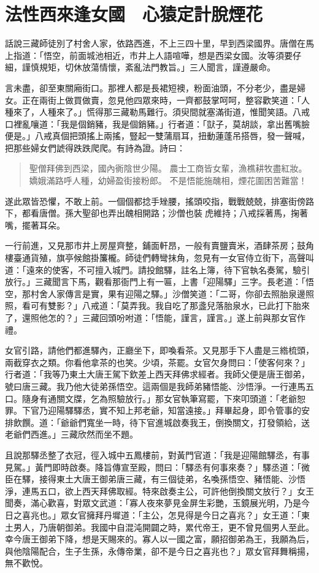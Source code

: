 
\chapter{法性西來逢女國　心猿定計脫煙花}

話說三藏師徒別了村舍人家，依路西進，不上三四十里，早到西梁國界。唐僧在馬上指道：「悟空，前面城池相近，市井上人語喧嘩，想是西梁女國。汝等須要仔細，謹慎規矩，切休放蕩情懷，紊亂法門教旨。」三人聞言，謹遵嚴命。

言未盡，卻至東關廂街口。那裡人都是長裙短襖，粉面油頭，不分老少，盡是婦女。正在兩街上做買做賣，忽見他四眾來時，一齊都鼓掌呵呵，整容歡笑道：「人種來了，人種來了。」慌得那三藏勒馬難行。須臾間就塞滿街道，惟聞笑語。八戒口裡亂嚷道：「我是個銷豬，我是個銷豬。」行者道：「獃子，莫胡談，拿出舊嘴臉便是。」八戒真個把頭搖上兩搖，豎起一雙蒲扇耳，扭動蓮蓬吊搭唇，發一聲喊，把那些婦女們諕得跌跌爬爬。有詩為證。詩曰：
\begin{quote}
聖僧拜佛到西梁，國內衠陰世少陽。
農士工商皆女輩，漁樵耕牧盡紅妝。
嬌娥滿路呼人種，幼婦盈街接粉郎。
不是悟能施醜相，煙花圍困苦難當！
\end{quote}

遂此眾皆恐懼，不敢上前。一個個都捻手矬腰，搖頭咬指，戰戰兢兢，排塞街傍路下，都看唐僧。孫大聖卻也弄出醜相開路；沙僧也裝𡤫虎維持；八戒採著馬，掬著嘴，擺著耳朵。

一行前進，又見那市井上房屋齊整，鋪面軒昂，一般有賣鹽賣米，酒肆茶房；鼓角樓臺通貨殖，旗亭候館掛簾櫳。師徒們轉彎抹角，忽見有一女官侍立街下，高聲叫道：「遠來的使客，不可擅入城門。請投館驛，註名上簿，待下官執名奏駕，驗引放行。」三藏聞言下馬，觀看那衙門上有一匾，上書「迎陽驛」三字。長老道：「悟空，那村舍人家傳言是實，果有迎陽之驛。」沙僧笑道：「二哥，你卻去照胎泉邊照照，看可有雙影？」八戒道：「莫弄我。我自吃了那盞兒落胎泉水，已此打下胎來了，還照他怎的？」三藏回頭吩咐道：「悟能，謹言，謹言。」遂上前與那女官作禮。

女官引路，請他們都進驛內，正廳坐下，即喚看茶。又見那手下人盡是三綹梳頭，兩截穿衣之類。你看他拿茶的也笑。少頃，茶罷。女官欠身問曰：「使客何來？」行者道：「我等乃東土大唐王駕下欽差上西天拜佛求經者。我師父便是唐王御弟，號曰唐三藏。我乃他大徒弟孫悟空。這兩個是我師弟豬悟能、沙悟淨。一行連馬五口。隨身有通關文牒，乞為照驗放行。」那女官執筆寫罷，下來叩頭道：「老爺恕罪。下官乃迎陽驛驛丞，實不知上邦老爺，知當遠接。」拜畢起身，即令管事的安排飲饌。道：「爺爺們寬坐一時，待下官進城啟奏我王，倒換關文，打發領給，送老爺們西進。」三藏欣然而坐不題。

且說那驛丞整了衣冠，徑入城中五鳳樓前，對黃門官道：「我是迎陽館驛丞，有事見駕。」黃門即時啟奏。降旨傳宣至殿，問曰：「驛丞有何事來奏？」驛丞道：「微臣在驛，接得東土大唐王御弟唐三藏，有三個徒弟，名喚孫悟空、豬悟能、沙悟淨，連馬五口，欲上西天拜佛取經。特來啟奏主公，可許他倒換關文放行？」女王聞奏，滿心歡喜，對眾文武道：「寡人夜來夢見金屏生彩艷，玉鏡展光明，乃是今日之喜兆也。」眾女官擁拜丹墀道：「主公，怎見得是今日之喜兆？」女王道：「東土男人，乃唐朝御弟。我國中自混沌開闢之時，累代帝王，更不曾見個男人至此。幸今唐王御弟下降，想是天賜來的。寡人以一國之富，願招御弟為王，我願為后，與他陰陽配合，生子生孫，永傳帝業，卻不是今日之喜兆也？」眾女官拜舞稱揚，無不歡悅。

